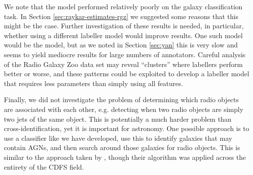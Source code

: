   We note that the \citeauthor{raykar10} model performed relatively poorly on
  the galaxy classification task. In Section \ref{sec:raykar-estimates-rgz} we
  suggested some reasons that this might be the case. Further investigation of
  these results is needed, in particular, whether using a different labeller
  model would improve results. One such model would be the \citeauthor{yan10}
  model, but as we noted in Section \ref{sec:yan} this is very slow and seems to
  yield mediocre results for large numbers of annotators. Careful analysis of
  the Radio Galaxy Zoo data set may reveal ``clusters'' where labellers perform
  better or worse, and these patterns could be exploited to develop a labeller
  model that requires less parameters than simply using all features.

  Finally, we did not investigate the problem of determining which radio objects
  are associated with each other, e.g. detecting when two radio objects are
  simply two jets of the same object. This is potentially a much harder problem
  than cross-identification, yet it is important for astronomy. One possible
  approach is to use a classifier like we have developed, use this to identify
  galaxies that may contain AGNs, and then search around those galaxies for
  radio objects. This is similar to the approach taken by \citet{fan15}, though
  their algorithm was applied across the entirety of the CDFS field.
